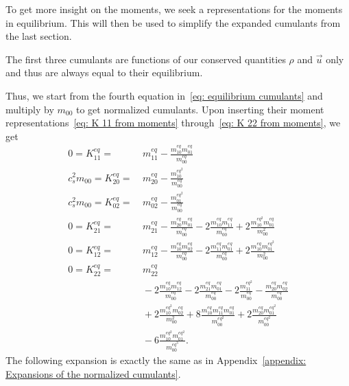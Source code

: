 
To get more insight on the moments, we seek a representations for the moments in equilibrium.
This will then be used to simplify the expanded cumulants from the last section.

The first three cumulants are functions of our conserved quantities $\rho$ and $\vec{u}$ only and thus are always equal to their equilibrium.

Thus, we start from the fourth equation in~\eqref{eq: equilibrium cumulants} and multiply by $m_{00}$ to get normalized cumulants.
Upon inserting their moment representations~\eqref{eq: K 11 from moments} through~\eqref{eq: K 22 from moments}, we get
\begin{equation*}
  \begin{aligned}
    0 = K_{11}^{eq} = &\ m_{11}^{eq} - \frac{m_{10}^{eq}m_{01}^{eq}}{m_{00}^{eq}}
    \\
    c_s^2 m_{00} = K_{20}^{eq} = &\ m_{20}^{eq} - \frac{m_{10}^{{eq}^2}}{m_{00}^{eq}}
    \\
    c_s^2 m_{00} = K_{02}^{eq} = &\ m_{02}^{eq} - \frac{m_{01}^{{eq}^2}}{m_{00}^{eq}}
    \\
    0 = K_{21}^{eq} = &\ m_{21}^{eq} - \frac{m_{20}^{eq}m_{01}^{eq}}{m_{00}^{eq}} - 2\frac{m_{10}^{eq}m_{11}^{eq}} {m_{00}^{eq}} + 2\frac{m_{10}^{{eq}^2} m_{01}^{eq}}{m_{00}^2}
    \\
    0 = K_{12}^{eq} = &\ m_{12}^{eq} - \frac{m_{10}^{eq}m_{02}^{eq}}{m_{00}^{eq}}
    - 2\frac{m_{11}^{eq}m_{01}^{eq}}{m_{00}^{eq}} + 2\frac{m_{10}^{eq} m_{01}^{{eq}^2}}{m_{00}^2}
    \\
    0 = K_{22}^{eq} = &\ m_{22}^{eq}
    \\&\
    - 2 \frac{m_{10}^{eq}m_{12}^{eq}}{m_{00}^{eq}} - 2\frac{m_{21}^{eq}m_{01}^{eq}}{m_{00}^{eq}}
    - 2 \frac{m_{11}^{{eq}^2}}{m_{00}^{eq}} - \frac{m_{20}^{eq}m_{02}^{eq}}{m_{00}^{eq}}
    \\&\
    + 2 \frac{m_{10}^{{eq}^2} m_{02}^{eq}}{m_{00}^2} + 8 \frac{m_{10}^{eq}m_{11}^{eq}m_{01}^{eq}} {m_{00}^{{eq}^2}}
    + 2 \frac{m_{20}^{eq}m_{01}^{{eq}^2}}{m_{00}^{{eq}^2}}
    \\&\
    - 6 \frac{m_{10}^{{eq}^2} m_{01}^{{eq}^2}}{m_{00}^{{eq}^3}}.
  \end{aligned}
\end{equation*}
The following expansion is exactly the same as in Appendix~\ref{appendix: Expansions of the normalized cumulants}.

